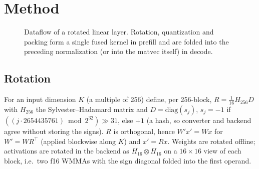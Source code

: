 \documentclass[10.5pt,a4paper]{article}
\begin{document}
\section{Method}
\label{sec:method}

\begin{figure}[H]
\centering
{}
\caption{Dataflow of a rotated linear layer. Rotation, quantization and packing form a single fused kernel in prefill and are folded into the preceding normalization (or into the matvec itself) in decode.}
\end{figure}

\subsection{Rotation}
For an input dimension $K$ (a multiple of 256) define, per 256-block, $R=\tfrac1{16}H_{256}D$ with $H_{256}$ the Sylvester--Hadamard matrix and $D=\mathrm{diag}(s_j)$,
$s_j=-1$ if $((j\cdot2654435761)\bmod2^{32})\gg31$, else $+1$ (a hash, so converter and backend agree without storing the signs). $R$ is orthogonal, hence $W'x'=Wx$ for
$W'=WR^{\top}$ (applied blockwise along $K$) and $x'=Rx$. Weights are rotated offline; activations are rotated in the backend as $H_{16}\otimes H_{16}$ on a $16\times16$ view of each block,
i.e.\ two f16 WMMAs with the sign diagonal folded into the first operand.
\end{document}
